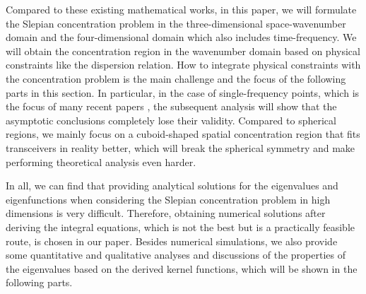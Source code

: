 \documentclass[12pt,draftclsnofoot,journal,onecolumn]{IEEEtran}
\begin{document}
{	Compared to these existing mathematical works, in this paper, we will formulate the Slepian concentration problem in the three-dimensional space-wavenumber domain and the four-dimensional domain which also includes time-frequency. We will obtain the concentration region in the wavenumber domain based on physical constraints like the dispersion relation. How to integrate physical constraints with the concentration problem is the main challenge and the focus of the following parts in this section. In particular, in the case of single-frequency points, which is the focus of many recent papers \cite{gong2023holographic,wei2023tri, pizzo2023wide}, the subsequent analysis will show that the asymptotic conclusions completely lose their validity. Compared to spherical regions, we mainly focus on a cuboid-shaped spatial concentration region that fits transceivers in reality better, which will break the spherical symmetry and make performing theoretical analysis even harder.  
	
	In all, we can find that providing analytical solutions for the eigenvalues and eigenfunctions when considering the Slepian concentration problem in high dimensions is very difficult. Therefore, obtaining numerical solutions after deriving the integral equations, which is not the best but is a practically feasible route, is chosen in our paper. Besides numerical simulations, we also provide some quantitative and qualitative analyses and discussions of the properties of the eigenvalues based on the derived kernel functions, which will be shown in the following parts.

}
	
\end{document}
